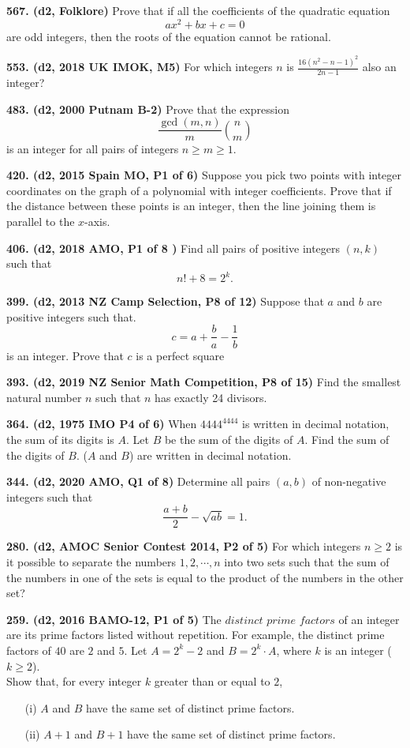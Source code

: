 \documentclass{article}
\begin{document}
\textbf{567. (\color{red}d2\color{black}, Folklore)} Prove that if all the coefficients of the quadratic equation
$$
    ax^2 + bx + c = 0
$$
are odd integers, then the roots of the equation cannot be rational.

\textbf{553. (\color{red}d2\color{black}, 2018 UK IMOK, M5)} For which integers $n$ is $\frac{16(n^2-n-1)^2}{2n-1}$ also an integer?

\textbf{483. (\color{red}d2\color{black}, 2000 Putnam B-2)} Prove that the expression
\[
    \frac{\gcd(m,n)}{m} \binom{n}{m}
\]
is an integer for all pairs of integers $n \geq m \geq 1$.

\textbf{420. (\color{red}d2\color{black}, 2015 Spain MO, P1 of 6)} Suppose you pick two points with integer coordinates on the graph of a polynomial with integer coefficients. Prove that if the distance between these points is an integer, then the line joining them is parallel to the $x$-axis.

\textbf{406. (\color{red}d2\color{black}, 2018 AMO, P1 of 8 )} Find all pairs of positive integers $(n, k)$ such that
$$
    n! + 8 = 2^k.
$$

\textbf{399. (\color{red}d2\color{black}, 2013 NZ Camp Selection, P8 of 12)} Suppose that $a$ and $b$ are positive integers such that.
$$
    c = a + \frac{b}{a} - \frac{1}{b}
$$
is an integer. Prove that $c$ is a perfect square

\textbf{393. (\color{red}d2\color{black}, 2019 NZ Senior Math Competition, P8 of 15)} Find the smallest natural number $n$ such that $n$ has exactly 24 divisors.

\textbf{364. (\color{red}d2\color{black}, 1975 IMO P4 of 6)} When \(4444^{4444}\) is written in decimal notation, the sum of its digits is \(A .\) Let
\(B\) be the sum of the digits of \(A .\) Find the sum of the digits of \(B\). ($A$ and $B$) are written in decimal notation.

\textbf{344. (\color{red}d2\color{black}, 2020 AMO, Q1 of 8)} Determine all pairs $(a, b)$ of non-negative integers such that $$\frac{a+b}{2} - \sqrt{ab} = 1.$$

\textbf{280. (\color{red}d2\color{black}, AMOC Senior Contest 2014, P2 of 5)} For which integers $n \geq 2$ is it possible to separate the numbers $1, 2, \cdots ,n$ into two sets such that the sum of the numbers in one of the sets is equal to the product of the numbers in the other set?

\textbf{259. (\color{red}d2\color{black}, 2016 BAMO-12, P1 of 5)} The ${\textit{distinct prime factors}}$ of an integer are its prime factors listed without repetition. For example, the distinct prime factors of $40$ are $2$ and $5$. Let $A=2^k - 2$ and $B= 2^k \cdot A$, where $k$ is an integer ($k \ge 2$).\\
\makebox[10pt]{} Show that, for every integer $k$ greater than or equal to $2$,
\begin{itemize}
    \item[(i)] $A$ and $B$ have the same set of distinct prime factors.
    \item[(ii)] $A+1$ and $B+1$ have the same set of distinct prime factors.
\end{itemize}
\end{document}
